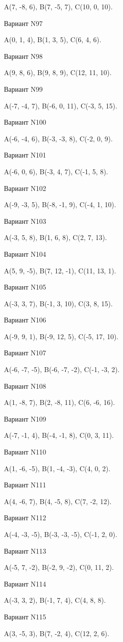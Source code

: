 \documentclass[11pt]{report}
\begin{document}
A(7, -8, 6), B(7, -5, 7), C(10, 0, 10).

Вариант N97

A(0, 1, 4), B(1, 3, 5), C(6, 4, 6).

Вариант N98

A(9, 8, 6), B(9, 8, 9), C(12, 11, 10).

Вариант N99

A(-7, -4, 7), B(-6, 0, 11), C(-3, 5, 15).

Вариант N100

A(-6, -4, 6), B(-3, -3, 8), C(-2, 0, 9).

Вариант N101

A(-6, 0, 6), B(-3, 4, 7), C(-1, 5, 8).

Вариант N102

A(-9, -3, 5), B(-8, -1, 9), C(-4, 1, 10).

Вариант N103

A(-3, 5, 8), B(1, 6, 8), C(2, 7, 13).

Вариант N104

A(5, 9, -5), B(7, 12, -1), C(11, 13, 1).

Вариант N105

A(-3, 3, 7), B(-1, 3, 10), C(3, 8, 15).

Вариант N106

A(-9, 9, 1), B(-9, 12, 5), C(-5, 17, 10).

Вариант N107

A(-6, -7, -5), B(-6, -7, -2), C(-1, -3, 2).

Вариант N108

A(1, -8, 7), B(2, -8, 11), C(6, -6, 16).

Вариант N109

A(-7, -1, 4), B(-4, -1, 8), C(0, 3, 11).

Вариант N110

A(1, -6, -5), B(1, -4, -3), C(4, 0, 2).

Вариант N111

A(4, -6, 7), B(4, -5, 8), C(7, -2, 12).

Вариант N112

A(-4, -3, -5), B(-3, -3, -5), C(-1, 2, 0).

Вариант N113

A(-5, 7, -2), B(-2, 9, -2), C(0, 11, 2).

Вариант N114

A(-3, 3, 2), B(-1, 7, 4), C(4, 8, 8).

Вариант N115

A(3, -5, 3), B(7, -2, 4), C(12, 2, 6).
\end{document}
